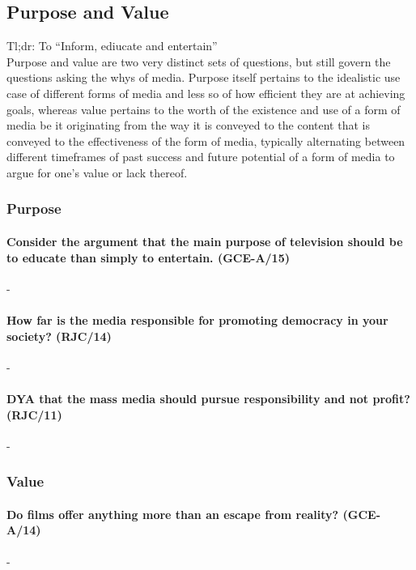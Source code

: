 \documentclass[../../main]{subfiles}
\begin{document}
\subsection{Purpose and Value}

Tl;dr: To ``Inform, ediucate and entertain'' \\

Purpose and value are two very distinct sets of questions, but still govern the questions asking the whys of media. Purpose itself pertains to the idealistic use case of different forms of media and less so of how efficient they are at achieving goals, whereas value pertains to the worth of the existence and use of a form of media be it originating from the way it is conveyed to the content that is conveyed to the effectiveness of the form of media, typically alternating between different timeframes of past success and future potential of a form of media to argue for one's value or lack thereof. 

\subsubsection{Purpose}

\paragraph{Consider the argument that the main purpose of television should be to educate than simply to entertain. (GCE-A/15)}-

\paragraph{How far is the media responsible for promoting democracy in your society? (RJC/14)}-

\paragraph{DYA that the mass media should pursue responsibility and not profit? (RJC/11)}-

\subsubsection{Value}

\paragraph{Do films offer anything more than an escape from reality? (GCE-A/14)} -
\end{document}
